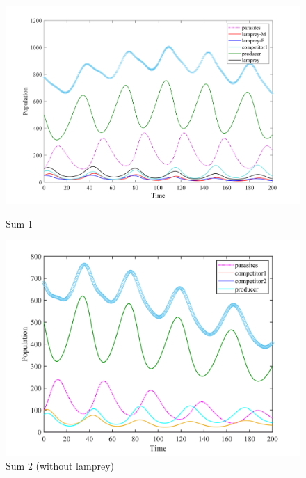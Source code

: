 \documentclass[12pt]{article}  %
\begin{document}
\begin{figure}[htbp]
	\begin{minipage}[b]{0.5\linewidth}
		\centering
		\includegraphics[width=\linewidth]{img/sum.png}
		\caption{Sum 1 }
	\end{minipage}%
	\begin{minipage}[b]{0.5\linewidth}
		\centering
		\includegraphics[width=\linewidth]{img/sum2.png}
		\caption{Sum 2 (without lamprey)}
	\end{minipage}
\end{figure}

\par
\end{document}
